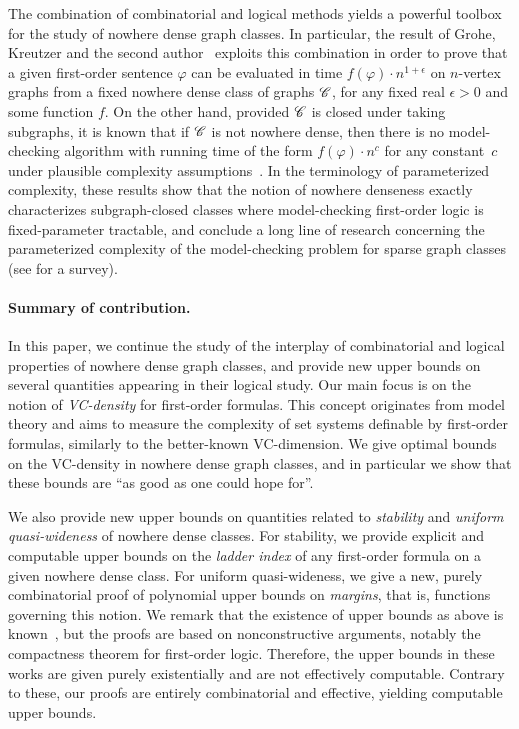 The combination of combinatorial and logical methods yields a powerful
toolbox for the study of nowhere dense graph classes. In particular,
the result of Grohe, Kreutzer and the second
author~\cite{grohe2014deciding} exploits this combination in order to
prove that a given first-order sentence $\varphi$ can be evaluated in
time $f(\varphi)\cdot n^{1+\epsilon}$ on $n$-vertex graphs from a
fixed nowhere dense class of graphs $\mathscr{C}$, for any fixed real
$\epsilon>0$ and some function $f$.  On the other hand, provided
$\mathscr{C}$ is closed under taking subgraphs, it is known that if $\mathscr{C}$ is
not nowhere dense, then there is no model-checking 
algorithm with running time of the
form $f(\varphi)\cdot n^c$ for any constant~$c$ under plausible
complexity assumptions~\cite{dvovrak2013testing}.  In the terminology
of parameterized complexity, these results show that the notion of
nowhere denseness exactly characterizes subgraph-closed classes where
model-checking first-order logic is fixed-parameter tractable, and
conclude a long line of research concerning the parameterized
complexity of the model-checking problem for sparse graph classes (see
\cite{grokre11} for a survey).

\paragraph{Summary of contribution.} In this paper, we continue the
study of the interplay of combinatorial and logical properties of
nowhere dense graph classes, and provide new upper bounds on several
quantities appearing in their logical study.  Our main focus is on the
notion of \emph{VC-density} for first-order formulas. This concept
originates from model theory and aims to measure the complexity of set
systems definable by first-order formulas, similarly to the
better-known VC-dimension.  We give optimal bounds on the VC-density
in nowhere dense graph classes, and in particular we show that these
bounds are ``as good as one could hope for''.

We also provide new upper bounds on quantities related to
{\em{stability}} and {\em{uniform quasi-wideness}} of nowhere dense
classes.  For stability, we provide explicit and computable upper
bounds on the \emph{ladder index} of any first-order formula on a
given nowhere dense class.  For uniform quasi-wideness, we give a new,
purely combinatorial proof of polynomial upper bounds on
{\em{margins}}, that is, functions governing this notion.  We remark
that the existence of upper bounds as above is
known~\cite{adler2014interpreting,siebertz2016polynomial}, but the
proofs are based on nonconstructive arguments, notably the compactness
theorem for first-order logic. Therefore, the upper bounds in these
works are given purely existentially and are not effectively
computable.  Contrary to these, our proofs are entirely combinatorial
and effective, yielding computable upper bounds.

